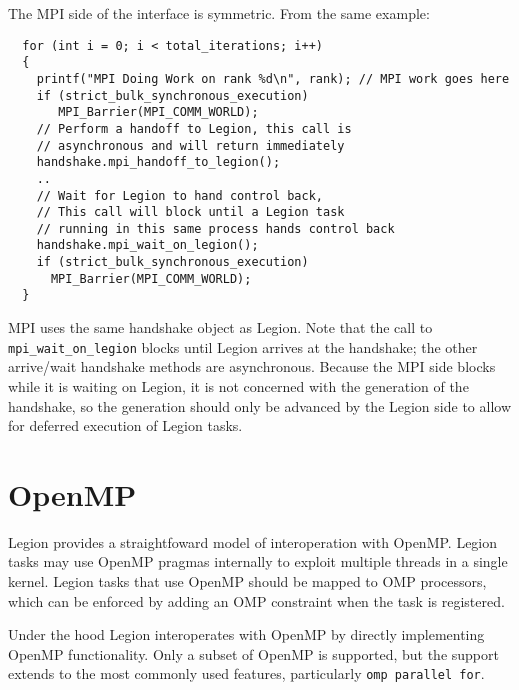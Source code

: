 The MPI side of the interface is symmetric.  From the same example:
\begin{lstlisting}
  for (int i = 0; i < total_iterations; i++)
  {
    printf("MPI Doing Work on rank %d\n", rank); // MPI work goes here
    if (strict_bulk_synchronous_execution)
       MPI_Barrier(MPI_COMM_WORLD);
    // Perform a handoff to Legion, this call is 
    // asynchronous and will return immediately
    handshake.mpi_handoff_to_legion();
    ..
    // Wait for Legion to hand control back,
    // This call will block until a Legion task
    // running in this same process hands control back
    handshake.mpi_wait_on_legion();
    if (strict_bulk_synchronous_execution)
      MPI_Barrier(MPI_COMM_WORLD);
  }
\end{lstlisting}
MPI uses the same handshake object as Legion.  Note that the
call to {\tt mpi\_wait\_on\_legion} blocks until Legion arrives at the handshake; the other arrive/wait handshake methods are asynchronous.
Because the MPI side blocks while it is waiting on Legion, it is not concerned with the generation of the handshake, so the generation should only be
advanced by the Legion side to allow for deferred execution of Legion tasks.


\section{OpenMP}
\label{sec:openmp}

Legion provides a straightfoward model of interoperation with OpenMP.  Legion tasks may use OpenMP pragmas internally to exploit
multiple threads in a single kernel.  Legion tasks that use OpenMP should be mapped to OMP processors, which can be enforced by
adding an OMP  constraint when the task is registered.

Under the hood Legion interoperates with OpenMP by directly implementing OpenMP functionality.  Only a subset of OpenMP is supported,
but the support extends to the most commonly used features, particularly {\tt omp parallel for}.

